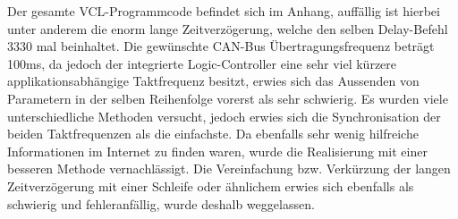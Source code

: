 Der gesamte VCL-Programmcode befindet sich im Anhang, auffällig ist hierbei unter anderem die enorm lange Zeitverzögerung, welche den selben Delay-Befehl 3330 mal beinhaltet. Die gewünschte CAN-Bus Übertragungsfrequenz beträgt 100ms, da jedoch der integrierte Logic-Controller eine sehr viel kürzere applikationsabhängige Taktfrequenz besitzt, erwies sich das Aussenden von Parametern in der selben Reihenfolge vorerst als sehr schwierig. Es wurden viele unterschiedliche Methoden versucht, jedoch erwies sich die Synchronisation der beiden Taktfrequenzen als die einfachste. Da ebenfalls sehr wenig hilfreiche Informationen im Internet zu finden waren, wurde die Realisierung mit einer besseren Methode vernachlässigt. Die Vereinfachung bzw. Verkürzung der langen Zeitverzögerung mit einer Schleife oder ähnlichem erwies sich ebenfalls als schwierig und fehleranfällig, wurde deshalb weggelassen.

\newpage

